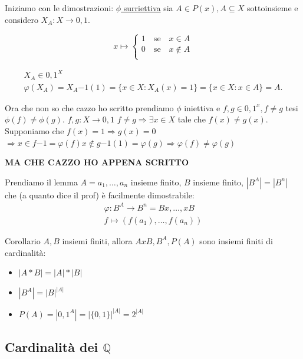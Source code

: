 \documentclass{article}
\begin{document}
Iniziamo con le dimostrazioni:
\underline{$\phi$ surriettiva} sia $A \in P(x), A \subseteq X$ sottoinsieme e considero $X_A : X \to {0,1}$.



\[x \mapsto  
\begin{cases}
        1 \quad \mbox{se} \quad x \in A \\
        0 \quad \mbox{se} \quad x \not \in A \\
\end{cases}
\]

\begin{align*}
X_A \in {0,1}^X \\
\varphi(X_A) = {X_A}{-1}(1) = \{x \in X : X_A(x) = 1\} = \{x \in X : x \in A\} = A.
\end{align*}

Ora che non so che cazzo ho scritto prendiamo $\phi$ iniettiva e $f,g \in {0,1}^x, f \not = g$ tesi $\phi(f) \not = \phi(g)$.
$f,g : X \to {0,1}$ \newline
$f \not = g \Rightarrow \exists x \in X$ tale che $f(x) \not = g(x)$.
Supponiamo che $f(x) = 1 \Rightarrow g(x) = 0$ \newline
$\Rightarrow x \in {f}{-1} = \varphi(f) x \not \in {g}{-1}(1) = \varphi(g) \Rightarrow \varphi(f) \not = \varphi(g)$

\textbf{MA CHE CAZZO HO APPENA SCRITTO} \newline


Prendiamo il lemma $A = {a_1,\ldots,a_n}$ insieme finito, $B$ insieme finito, $|B^A| = |B^n|$ che (a quanto dice il prof) è facilmente dimostrabile:
\begin{align*}
         \varphi : B^A \to B^n = Bx,\ldots,xB \\
                   f \mapsto (f(a_1),\ldots,f(a_n))
\end{align*}

Corollario $A,B$ insiemi finiti, allora $AxB, B^A, P(A)$ sono insiemi finiti di cardinalità:
\begin{itemize}
        \item $|A*B| = |A|*|B|$	
        \item $|B^A| = |B|^{|A|}$
        \item $P(A) = |{0,1}^A| = |\{0,1\}|^{|A|} = 2^{|A|}$	
\end{itemize}


\subsection{Cardinalità dei $\mathbb{Q}$}
\end{document}

